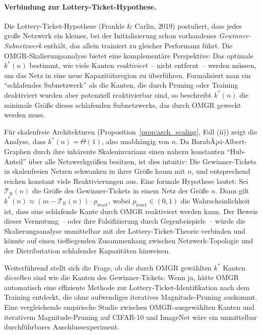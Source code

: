 ﻿\documentclass[12pt, a4paper, openany]{report}
\begin{document}
\paragraph{Verbindung zur Lottery-Ticket-Hypothese.}
Die Lottery-Ticket-Hypothese (Frankle \& Carlin, 2019) postuliert, dass jedes
große Netzwerk ein kleines, bei der Initialisierung schon vorhandenes
\emph{Gewinner-Subnetzwerk} enthält, das allein trainiert zu gleicher Performanz
führt.  Die OMGR-Skalierungsanalyse bietet eine komplementäre Perspektive:
Das optimale $k^*(n)$ bestimmt, wie viele Kanten \emph{reaktiviert}~-- nicht
entfernt~-- werden müssen, um das Netz in eine neue Kapazitätsregion zu
überführen.  Formal\-isiert man ein ``schlafendes Subnetzwerk'' als die Kanten,
die durch Pruning oder Training deaktiviert wurden aber potenziell reaktivierbar
sind, so beschreibt $k^*(n)$ die minimale Größe dieses schlafenden
Subnetzwerks, das durch OMGR geweckt werden muss.

Für skalenfreie Architekturen (Proposition~\ref{prop:arch_scaling}, Fall (ii))
zeigt die Analyse, dass $k^*(n) = \Theta(1)$, also unabhängig von $n$.  Da
BarabÃ¡si-Albert-Graphen durch ihre inhärente Skaleninvarianz einen
nahezu konstanten ``Hub-Anteil'' über alle Netzwerkgrößen besitzen, ist dies
intuitiv: Die Gewinner-Tickets in skalenfreien Netzen schwanken in ihrer
Größe kaum mit $n$, und entsprechend reichen konstant viele Reaktivierungen
aus.  Eine formale Hypothese lautet: Sei $\mathcal{T}_{\mathrm{lt}}(n)$
die Größe des Gewinner-Tickets in einem Netz der Größe $n$.  Dann gilt
$k^*(n) \approx (m - \mathcal{T}_{\mathrm{lt}}(n)) \cdot p_{\mathrm{react}}$,
wobei $p_{\mathrm{react}} \in (0,1)$ die Wahrscheinlichkeit ist, dass eine
schlafende Kante durch OMGR reaktiviert werden kann.  Der Beweis dieser
Vermutung~-- oder ihre Falsifizierung durch Gegenbeispiele~-- würde die
Skalierungsanalyse unmittelbar mit der Lottery-Ticket-Theorie verbinden und
könnte auf einen tiefliegenden Zusammenhang zwischen Netzwerk-Topologie und
der Distributation schlafender Kapazitäten hinweisen.

Weiterführend stellt sich die Frage, ob die durch OMGR gewählten $k^*$ Kanten
\emph{dieselben} sind wie die Kanten des Gewinner-Tickets: Wenn ja, hätte OMGR
automatisch eine effiziente Methode zur Lottery-Ticket-Identifikation nach dem
Training entdeckt, die ohne aufwendiges iteratives Magnitude-Pruning auskommt.
Eine vergleichende empirische Studie zwischen OMGR-ausgewählten Kanten und
iterativem Magnitude-Pruning auf CIFAR-10 und ImageNet wäre ein unmittelbar
durchführbares Anschlussexperiment.
\end{document}
